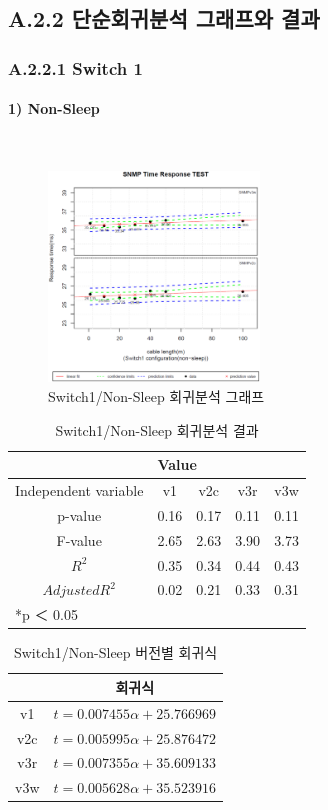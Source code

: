 \documentclass[11pt
  , a4paper
  , article
  , oneside
]{memoir}
\begin{document}
\clearpage
\subsection{A.2.2 단순회귀분석 그래프와 결과}
\subsubsection{A.2.2.1 Switch 1}
\paragraph{1) Non-Sleep}
   　
\begin{figure}[h!]
  \centering
  \includegraphics[width=0.5\textwidth]{./images/s1sx.eps}
  \caption{Switch1/Non-Sleep 회귀분석 그래프}
\end{figure}


\begin{table}[!htb]
\begin{center}
\begin{tabular}{c|c|c|c|c}\hline
& \multicolumn{4}{l}{Value} \\ \hline
Independent variable & v1 & v2c & v3r & v3w \\ \hline\hline
p-value& 0.16 & 0.17 & 0.11 & 0.11 \\ \hline
F-value& 2.65 & 2.63 & 3.90 & 3.73 \\ \hline
$  R^2  $ & 0.35 & 0.34 & 0.44 & 0.43 \\\hline
$ Adjusted R^2 $ & 0.02 & 0.21 & 0.33 & 0.31 \\\hline 
\multicolumn{5}{l}{*p ＜ 0.05} \\ \hline
\end{tabular}
\caption{Switch1/Non-Sleep 회귀분석 결과}
\end{center}
\end{table} 


\begin{table}[!htb]
\begin{center}
\begin{tabular}{c|c}\hline
 & 회귀식  \\ \hline\hline
v1 &  $ t=0.007455\alpha + 25.766969 $  \\ 
v2c & $ t=0.005995\alpha + 25.876472 $ \\ 
v3r & $ t=0.007355\alpha + 35.609133 $ \\ 
v3w & $ t=0.005628\alpha + 35.523916 $  \\ \hline
\end{tabular}
\caption{Switch1/Non-Sleep 버전별 회귀식}
\end{center}
\end{table} 
\end{document}
